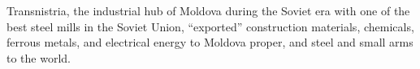 \documentclass[12pt,a4paper]{article}%
\begin{document}
Transnistria, the industrial hub of Moldova during the Soviet era with one of the best steel mills in the Soviet Union, ``exported'' construction materials, chemicals, ferrous metals, and electrical energy to Moldova proper, and steel and small arms to the world.



 
 
\end{document}

